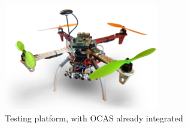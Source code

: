 
\begin{figure}[htbp]
	\centering
	\includegraphics[width=0.6\textwidth]{./figures/platform1.png}
	\caption{Testing platform, with OCAS already integrated}
	\label{fig:platform}
\end{figure}
